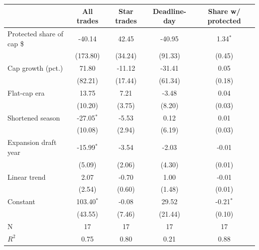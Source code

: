 \begin{tabular}{lcccc}\toprule
 & All trades & Star trades & Deadline-day & Share w/ protected\\\midrule
Protected share of cap \$ & -40.14 & 42.45 & -40.95 & 1.34$^{*}$\\
 & (173.80) & (34.24) & (91.33) & (0.45)\\
Cap growth (pct.) & 71.80 & -11.12 & -31.41 & 0.05\\
 & (82.21) & (17.44) & (61.34) & (0.18)\\
Flat-cap era & 13.75 & 7.21 & -3.48 & 0.04\\
 & (10.20) & (3.75) & (8.20) & (0.03)\\
Shortened season & -27.05$^{*}$ & -5.53 & 0.12 & 0.01\\
 & (10.08) & (2.94) & (6.19) & (0.03)\\
Expansion draft year & -15.99$^{*}$ & -3.54 & -2.03 & -0.01\\
 & (5.09) & (2.06) & (4.30) & (0.01)\\
Linear trend & 2.07 & -0.70 & 1.00 & -0.01\\
 & (2.54) & (0.60) & (1.48) & (0.01)\\
Constant & 103.40$^{*}$ & -0.08 & 29.52 & -0.21$^{*}$\\
 & (43.55) & (7.46) & (21.44) & (0.10)\\
N & 17 & 17 & 17 & 17\\
$R^2$ & 0.75 & 0.80 & 0.21 & 0.88\\
\bottomrule\end{tabular}